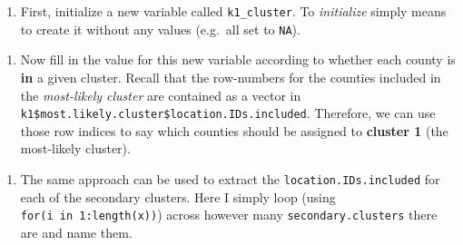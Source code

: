 \documentclass[
]{book}
\newenvironment{Shaded}{\begin{snugshade}}{\end{snugshade}}
\newcommand{\AttributeTok}[1]{\textcolor[rgb]{0.77,0.63,0.00}{#1}}
\newcommand{\ConstantTok}[1]{\textcolor[rgb]{0.00,0.00,0.00}{#1}}
\newcommand{\ControlFlowTok}[1]{\textcolor[rgb]{0.13,0.29,0.53}{\textbf{#1}}}
\newcommand{\DecValTok}[1]{\textcolor[rgb]{0.00,0.00,0.81}{#1}}
\newcommand{\FunctionTok}[1]{\textcolor[rgb]{0.00,0.00,0.00}{#1}}
\newcommand{\NormalTok}[1]{#1}
\newcommand{\OtherTok}[1]{\textcolor[rgb]{0.56,0.35,0.01}{#1}}
\newcommand{\SpecialCharTok}[1]{\textcolor[rgb]{0.00,0.00,0.00}{#1}}
\newcommand{\StringTok}[1]{\textcolor[rgb]{0.31,0.60,0.02}{#1}}
\providecommand{\tightlist}{%
  \setlength{\itemsep}{0pt}\setlength{\parskip}{0pt}}
\begin{document}
\begin{enumerate}
\def\labelenumi{\arabic{enumi}.}
\tightlist
\item
  First, initialize a new variable called \texttt{k1\_cluster}. To \emph{initialize} simply means to create it without any values (e.g.~all set to \texttt{NA}).
\end{enumerate}

\begin{Shaded}
\end{Shaded}

\begin{enumerate}
\def\labelenumi{\arabic{enumi}.}
\setcounter{enumi}{1}
\tightlist
\item
  Now fill in the value for this new variable according to whether each county is \textbf{in} a given cluster. Recall that the row-numbers for the counties included in the \emph{most-likely cluster} are contained as a vector in \texttt{k1\$most.likely.cluster\$location.IDs.included}. Therefore, we can use those row indices to say which counties should be assigned to \textbf{cluster 1} (the most-likely cluster).
\end{enumerate}

\begin{Shaded}
\end{Shaded}

\begin{enumerate}
\def\labelenumi{\arabic{enumi}.}
\setcounter{enumi}{2}
\tightlist
\item
  The same approach can be used to extract the \texttt{location.IDs.included} for each of the secondary clusters. Here I simply loop (using \texttt{for(i\ in\ 1:length(x))}) across however many \texttt{secondary.clusters} there are and name them.
\end{enumerate}

\begin{Shaded}
\end{Shaded}
\end{document}
